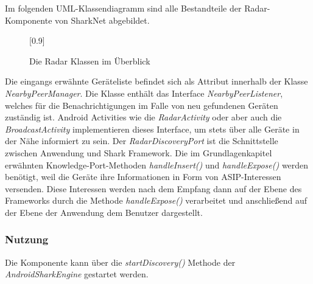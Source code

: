 Im folgenden UML-Klassendiagramm sind alle Bestandteile der Radar-Komponente von SharkNet abgebildet.
\begin{figure}[H]
	\centering
	\scalebox{1}[0.9]{}
	\caption{Die Radar Klassen im Überblick}
	\label{fig:radarhAll}
\end{figure}
Die eingangs erwähnte Geräteliste befindet sich als Attribut innerhalb der Klasse \textit{Nearby\-Peer\-Manager}. Die Klasse enthält das Interface \textit{NearbyPeerListener}, welches für die Benachrichtigungen im Falle von neu gefundenen Geräten zuständig ist. Android Activities wie die \textit{RadarActivity} oder aber auch die \textit{BroadcastActivity} implementieren dieses Interface, um stets über alle Geräte in der Nähe informiert zu sein. Der \textit{RadarDiscoveryPort} ist die Schnittstelle zwischen Anwendung und Shark Framework. Die im Grundlagenkapitel erwähnten Knowledge-Port-Methoden \textit{handleInsert()} und \textit{handleExpose()} werden benötigt, weil die Geräte ihre Informationen in Form von ASIP-Interessen versenden. Diese Interessen werden nach dem Empfang dann auf der Ebene des Frameworks durch die Methode \textit{handleExpose()} verarbeitet und anschließend auf der Ebene der Anwendung dem Benutzer dargestellt.

\subsubsection{Nutzung}
Die Komponente kann über die \textit{startDiscovery()} Methode der \textit{AndroidSharkEngine} gestartet werden.

